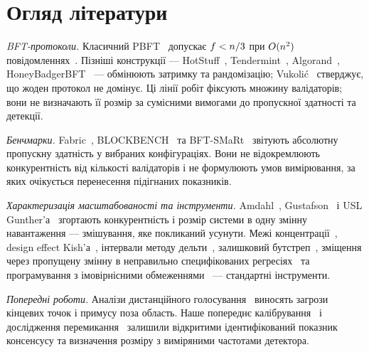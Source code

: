 \section{Огляд літератури}
\label{sec:related}

\emph{BFT-протоколи.}
Класичний PBFT~\cite{castro1999} допускає $f<n/3$ при $O(n^{2})$
повідомленнях~\cite{lamport1982,dwork1988}. Пізніші конструкції ---
HotStuff~\cite{yin2019}, Tendermint~\cite{buchman2016},
Algorand~\cite{gilad2017}, HoneyBadgerBFT~\cite{miller2016} --- обмінюють
затримку та рандомізацію; Vukoli\'{c}~\cite{vukolic2015} стверджує, що жоден
протокол не домінує. Ці лінії робіт фіксують множину валідаторів; вони не
визначають її розмір за сумісними вимогами до пропускної здатності та детекції.

\emph{Бенчмарки.}
Fabric~\cite{androulaki2018,thakkar2018}, BLOCKBENCH~\cite{dinh2017} та
BFT-SMaRt~\cite{sousa2018} звітують абсолютну пропускну здатність у вибраних
конфігураціях. Вони не відокремлюють конкурентність від кількості валідаторів і
не формулюють умов вимірювання, за яких очікується перенесення підігнаних
показників.

\emph{Характеризація масштабованості та інструменти.}
Amdahl~\cite{amdahl1967}, Gustafson~\cite{gustafson1988} і USL
Gunther'а~\cite{gunther2007} згортають конкурентність і розмір системи в одну
змінну навантаження --- змішування, яке \RNM{} покликаний усунути. Межі
концентрації~\cite{hoeffding1963,boucheron2013}, design effect
Kish'а~\cite{kish1965}, інтервали методу дельти~\cite{seber2003}, залишковий
бутстреп~\cite{efron1993}, зміщення через пропущену змінну в неправильно
специфікованих регресіях~\cite{wooldridge2010} та програмування з імовірнісними
обмеженнями~\cite{charnes1959,nemirovski2007} --- стандартні інструменти.

\emph{Попередні роботи.}
Аналізи дистанційного голосування~\cite{springall2014,specter2020,park2021}
виносять загрози кінцевих точок і примусу поза область. Наше попереднє
калібрування~\cite{peniak2026a} і дослідження перемикання~\cite{peniak2026b}
залишили відкритими ідентифікований показник консенсусу та визначення розміру з
виміряними частотами детектора.
